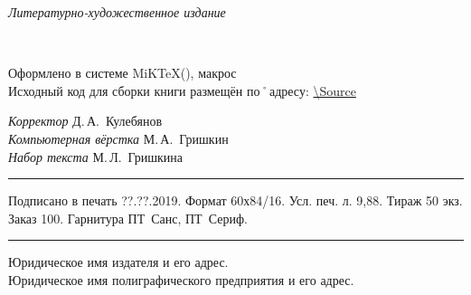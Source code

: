 ﻿\clearpage

\thispagestyle{empty}
\noindent\begin{center}
	{\itshape Литературно-художественное издание\par}
\end{center}	
\vfill\noindent
\begin{center}
	{\large{\bfseries\MakeUppercase{\AuthorFam}} \AuthorName\\[3ex]}	
	{\LARGE\Title}
\end{center}

\small 
\vfill\noindent
\begin{center}
	Оформлено в системе MiK\TeX(\LaTeXe), макрос \KOMAScript\\[1ex]
	Исходный код для сборки книги размещён по˚адресу: \footnotesize\url{\Source}
\end{center}
	
\vfill\noindent
\begin{center}
	{\itshape Корректор} Д.\,А.~Кулебянов\\[1ex]
	{\itshape Компьютерная вёрстка} М.\,А.~Гришкин\\[1ex]
	{\itshape Набор текста} М.\,Л.~Гришкина\\[1ex]
\end{center}

\vfill\noindent
\rule{\textwidth}{.5pt}
\begin{center}
	Подписано в печать  ??.??.2019. Формат 60х84/16. Усл. печ. л. 9,88. Тираж 50 экз. Заказ 100. Гарнитура ПТ~Санс, ПТ~Сериф.		
\end{center}
\rule{\textwidth}{.5pt}

\vfil\noindent		
\begin{center}
		
		Юридическое имя издателя и его адрес.\\[1ex]
				
		Юридическое имя полиграфического предприятия и его адрес.
\end{center}

